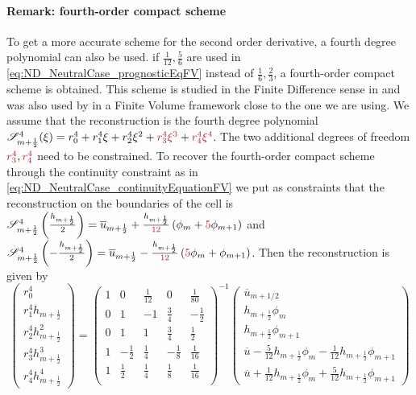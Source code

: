 \paragraph{Remark: fourth-order compact scheme}
To get a more accurate scheme for the second order derivative,
a fourth degree polynomial can also be used.
if $\frac{1}{12}, \frac{5}{6}$ are used in
\eqref{eq:ND_NeutralCase_prognosticEqFV} instead of
$\frac{1}{6}, \frac{2}{3}$, a fourth-order compact scheme
is obtained. This scheme is studied in the Finite Difference sense
in \citep{adam_highly_1977} and was also used
by \cite{piller_finite-volume_2004} in a Finite Volume framework
close to the one we are using.
We assume that the reconstruction is the fourth degree
polynomial
${\cal S}_{m+\frac{1}{2}}^4(\xi) = r_0^4 + r_1^4 \xi + r_2^4 \xi^2 
+ \emphase{r_3^4 \xi^3} + \emphase{r_4^4 \xi^4}$.
The two additional degrees of freedom $\emphase{r_3^4},
\emphase{r_4^4}$ need to be
constrained. To recover the fourth-order compact scheme through
the continuity constraint as in
\eqref{eq:ND_NeutralCase_continuityEquationFV}
we put as constraints that the
reconstruction on the boundaries of the cell is
${\cal S}^4_{m+\frac{1}{2}}\left(\frac{h_{m+\frac{1}{2}}}{2}\right) =
\overline{u}_{m+\frac{1}{2}} +
\frac{h_{m+\frac{1}{2}}}{\emphase{12}}\left(
\phi_m + \emphase{5}\phi_{m+1}\right) $ and
${\cal S}^4_{m+\frac{1}{2}}\left(-\frac{h_{m+\frac{1}{2}}}{2}\right) =
\overline{u}_{m+\frac{1}{2}} -
\frac{h_{m+\frac{1}{2}}}{\emphase{12}}\left(
\emphase{5}\phi_m + \phi_{m+1}\right)$.
Then the reconstruction is given by
\begin{equation}
    \begin{pmatrix}
    r_0^4 \\
    r_1^4 h_{m+\frac{1}{2}} \\
    r_2^4 h_{m+\frac{1}{2}}^2 \\
    r_3^4 h_{m+\frac{1}{2}}^3 \\
    r_4^4 h_{m+\frac{1}{2}}^4
    \end{pmatrix}
     = 
    \begin{pmatrix}
    1 & 0 & \frac{1}{12} & 0 & \frac{1}{80} \\
    0 & 1 & -1 & \frac{3}{4} & -\frac{1}{2} \\
    0 & 1 & 1 & \frac{3}{4} & \frac{1}{2} \\
    1 & -\frac{1}{2} & \frac{1}{4} & -\frac{1}{8}
    & \frac{1}{16} \\
    1 & \frac{1}{2} & \frac{1}{4} & \frac{1}{8}
    & \frac{1}{16} \\
    \end{pmatrix}^{-1}
    \begin{pmatrix}
    \overline{u}_{m+1/2} \\
    h_{m+\frac{1}{2}} \phi_m \\
	    h_{m+\frac{1}{2}} \phi_{m+1} \\
	    \overline{u} - \frac{5}{12} h_{m+\frac{1}{2}} \phi_m
	    - \frac{1}{12} h_{m+\frac{1}{2}} \phi_{m+1} \\
	    \overline{u} + \frac{1}{12} h_{m+\frac{1}{2}} \phi_m
	    + \frac{5}{12} h_{m+\frac{1}{2}} \phi_{m+1}
    \end{pmatrix}
\end{equation}
